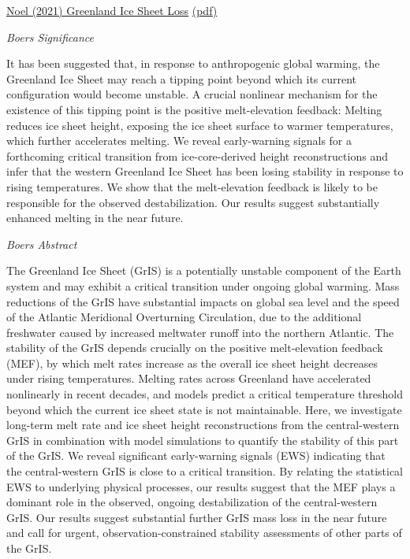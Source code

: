 \documentclass[
]{book}
\begin{document}
\href{https://agupubs.onlinelibrary.wiley.com/doi/10.1029/2020GL090471}{Noel (2021) Greenland Ice Sheet Loss}
\href{pdf/Noel_2021_Greenland_Ice_Sheet_Loss.pdf}{(pdf)}

\emph{Boers Significance}

It has been suggested that, in response to anthropogenic global warming, the Greenland Ice Sheet may reach a tipping point beyond which its current configuration would become unstable. A crucial nonlinear mechanism for the existence of this tipping point is the positive melt-elevation feedback: Melting reduces ice sheet height, exposing the ice sheet surface to warmer temperatures, which further accelerates melting. We reveal early-warning signals for a forthcoming critical transition from ice-core-derived height reconstructions and infer that the western Greenland Ice Sheet has been losing stability in response to rising temperatures. We show that the melt-elevation feedback is likely to be responsible for the observed destabilization. Our results suggest substantially enhanced melting in the near future.

\emph{Boers Abstract}

The Greenland Ice Sheet (GrIS) is a potentially unstable component of the Earth system and may exhibit a critical transition under ongoing global warming. Mass reductions of the GrIS have substantial impacts on global sea level and the speed of the Atlantic Meridional Overturning Circulation, due to the additional freshwater caused by increased meltwater runoff into the northern Atlantic. The stability of the GrIS depends crucially on the positive melt-elevation feedback (MEF), by which melt rates increase as the overall ice sheet height decreases under rising temperatures. Melting rates across Greenland have accelerated nonlinearly in recent decades, and models predict a critical temperature threshold beyond which the current ice sheet state is not maintainable. Here, we investigate long-term melt rate and ice sheet height reconstructions from the central-western GrIS in combination with model simulations to quantify the stability of this part of the GrIS. We reveal significant early-warning signals (EWS) indicating that the central-western GrIS is close to a critical transition. By relating the statistical EWS to underlying physical processes, our results suggest that the MEF plays a dominant role in the observed, ongoing destabilization of the central-western GrIS. Our results suggest substantial further GrIS mass loss in the near future and call for urgent, observation-constrained stability assessments of other parts of the GrIS.
\end{document}
